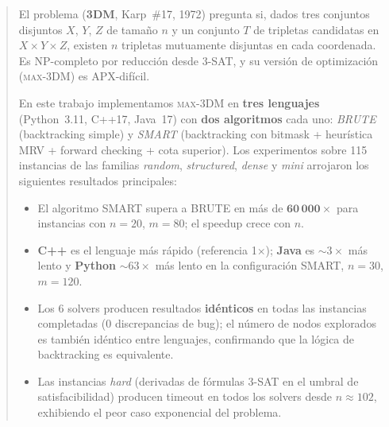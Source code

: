\begin{abstract}
El problema \threedm{} (\textbf{3DM}, Karp~\#17, 1972) pregunta si, dados tres
conjuntos disjuntos $X$, $Y$, $Z$ de tamaño $n$ y un conjunto $T$ de tripletas
candidatas en $X\times Y\times Z$, existen $n$ tripletas mutuamente disjuntas
en cada coordenada.  Es NP-completo por reducción desde 3-SAT, y su versión de
optimización (\textsc{max-3DM}) es APX-difícil.

En este trabajo implementamos \textsc{max-3DM} en \textbf{tres lenguajes}
(Python~3.11, C++17, Java~17) con \textbf{dos algoritmos} cada uno:
\textit{BRUTE} (backtracking simple) y \textit{SMART} (backtracking con
bitmask + heurística MRV + forward checking + cota superior).
Los experimentos sobre 115 instancias de las familias
\textit{random}, \textit{structured}, \textit{dense} y \textit{mini}
arrojaron los siguientes resultados principales:
\begin{itemize}
  \item El algoritmo SMART supera a BRUTE en más de
        $\mathbf{60\,000\times}$ para instancias con $n{=}20$, $m{=}80$;
        el speedup crece con $n$.
  \item \textbf{C++} es el lenguaje más rápido (referencia 1$\times$);
        \textbf{Java} es ${\sim}3\times$ más lento y \textbf{Python}
        ${\sim}63\times$ más lento en la configuración SMART, $n{=}30$, $m{=}120$.
  \item Los 6 solvers producen resultados \textbf{idénticos} en todas las
        instancias completadas (0 discrepancias de bug); el número de nodos
        explorados es también idéntico entre lenguajes, confirmando que la
        lógica de backtracking es equivalente.
  \item Las instancias \textit{hard} (derivadas de fórmulas 3-SAT en el
        umbral de satisfacibilidad) producen timeout en todos los solvers
        desde $n{\approx}102$, exhibiendo el peor caso exponencial del problema.
\end{itemize}
\end{abstract}
